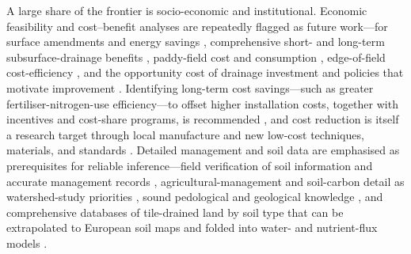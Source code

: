 A large share of the frontier is socio-economic and institutional. Economic
feasibility and cost--benefit analyses are repeatedly flagged as future
work---for surface amendments and energy savings \parencite{Wamono2016b},
comprehensive short- and long-term subsurface-drainage benefits
\parencite{Guo2025}, paddy-field cost and consumption \parencite{Jia2023},
edge-of-field cost-efficiency \parencite{Mendes2020}, and the opportunity cost of
drainage investment and policies that motivate improvement
\parencite{Wichelns2002,THOMAS1995,Kladivko2005,Saadat2017,Manik2019,Helmers2012}.
Identifying long-term cost savings---such as greater fertiliser-nitrogen-use
efficiency---to offset higher installation costs, together with incentives and
cost-share programs, is recommended \parencite{Castellano2019,Sunohara2015}, and
cost reduction is itself a research target through local manufacture and new
low-cost techniques, materials, and standards \parencite{Datta2002,Yannopoulos2020}.
Detailed management and soil data are emphasised as prerequisites for reliable
inference---field verification of soil information and accurate management records
\parencite{JORJANI1991}, agricultural-management and soil-carbon detail as
watershed-study priorities \parencite{Williams2017}, sound pedological and
geological knowledge \parencite{Jacobsen2007}, and comprehensive databases of
tile-drained land by soil type that can be extrapolated to European soil maps and
folded into water- and nutrient-flux models
\parencite{Hirt2005,Hirt2005b,Hirt2011}.


